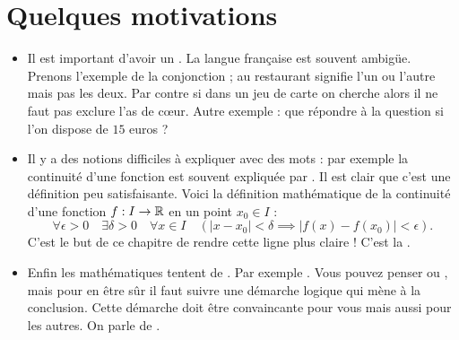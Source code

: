 \documentclass[11pt,class=report,crop=false]{standalone}
\begin{document}




\section*{Quelques motivations}

\begin{itemize}
  \item Il est important d'avoir un . La langue française
est souvent ambigüe. Prenons l'exemple de la conjonction  ; au restaurant
 signifie l'un ou l'autre mais pas les deux. Par contre si dans un jeu de
carte on cherche  alors il ne faut pas exclure l'as de c\oe ur.
Autre exemple : que répondre à la question   si l'on dispose de $15$ euros ?

  \item Il y a des notions difficiles à expliquer avec des mots : par exemple la continuité d'une fonction est
souvent expliquée par . Il est clair que c'est une définition peu satisfaisante.
Voici la définition mathématique de la continuité d'une fonction $f : I \to \mathbb{R}$ en un point $x_0\in I$ :
$$\forall \epsilon > 0 \quad \exists \delta >0 \quad \forall x \in I \quad
  (|x-x_0|<\delta \implies |f(x)-f(x_0)|< \epsilon).$$
C'est le but de ce chapitre de rendre cette ligne plus claire ! C'est la .

  \item Enfin les mathématiques tentent de .
  Par exemple .
Vous pouvez penser   ou ,
mais pour en être sûr il faut suivre une démarche logique qui mène à la conclusion. Cette démarche doit être convaincante
pour vous mais aussi pour les autres. On parle de .
\end{itemize}
\end{document}
